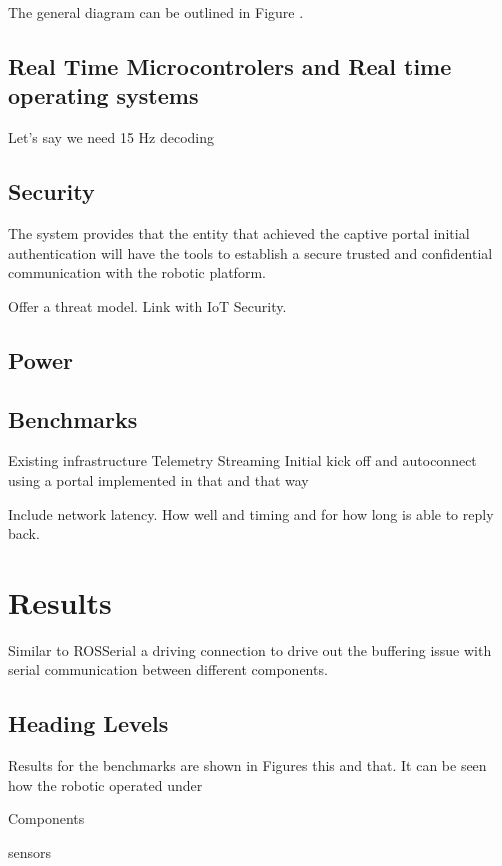 The general diagram can be outlined in Figure .


\subsection{Real Time Microcontrolers and Real time operating systems}

Let's say we need 15 Hz decoding 

\subsection{Security}

The system provides that the entity that achieved the captive portal initial authentication will have the tools to establish a secure trusted and confidential communication with the robotic platform.

Offer a threat model.  Link with IoT Security.

\subsection{Power}


\subsection{Benchmarks}

Existing infrastructure
Telemetry
Streaming
Initial kick off and autoconnect using a portal implemented in that and that way

Include network latency.  How well and timing and for how long is able to reply back.

\section{Results}
\label{sec:results}

Similar to ROSSerial a driving connection to drive out the buffering issue with serial communication between different components.

\subsection{Heading Levels}

Results for the benchmarks are shown in Figures this and that.  It can be seen how the robotic operated under 


Components 

sensors

